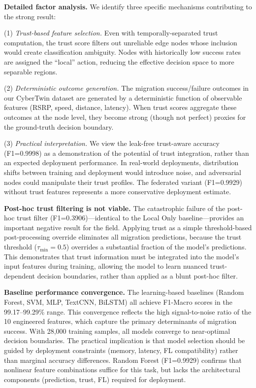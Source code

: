\documentclass[journal,twoside]{IEEEtran}
\begin{document}
\textbf{Detailed factor analysis.} We identify three specific mechanisms contributing to the strong result:

(1) \textit{Trust-based feature selection.} Even with temporally-separated trust computation, the trust score filters out unreliable edge nodes whose inclusion would create classification ambiguity. Nodes with historically low success rates are assigned the ``local'' action, reducing the effective decision space to more separable regions.

(2) \textit{Deterministic outcome generation.} The migration success/failure outcomes in our CyberTwin dataset are generated by a deterministic function of observable features (RSRP, speed, distance, latency). When trust scores aggregate these outcomes at the node level, they become strong (though not perfect) proxies for the ground-truth decision boundary.

(3) \textit{Practical interpretation.} We view the leak-free trust-aware accuracy (F1=0.9998) as a demonstration of the potential of trust integration, rather than an expected deployment performance. In real-world deployments, distribution shifts between training and deployment would introduce noise, and adversarial nodes could manipulate their trust profiles. The federated variant (F1=0.9929) without trust features represents a more conservative deployment estimate.

\textbf{Post-hoc trust filtering is not viable.} The catastrophic failure of the post-hoc trust filter (F1=0.3906)---identical to the Local Only baseline---provides an important negative result for the field. Applying trust as a simple threshold-based post-processing override eliminates all migration predictions, because the trust threshold ($\tau_{\min}=0.5$) overrides a substantial fraction of the model's predictions. This demonstrates that trust information must be integrated into the model's input features during training, allowing the model to learn nuanced trust-dependent decision boundaries, rather than applied as a blunt post-hoc filter.

\textbf{Baseline performance convergence.} The learning-based baselines (Random Forest, SVM, MLP, TextCNN, BiLSTM) all achieve F1-Macro scores in the 99.17--99.29\% range. This convergence reflects the high signal-to-noise ratio of the 10 engineered features, which capture the primary determinants of migration success. With 28,000 training samples, all models converge to near-optimal decision boundaries. The practical implication is that model selection should be guided by deployment constraints (memory, latency, FL compatibility) rather than marginal accuracy differences. Random Forest (F1=0.9929) confirms that nonlinear feature combinations suffice for this task, but lacks the architectural components (prediction, trust, FL) required for deployment.
\end{document}
